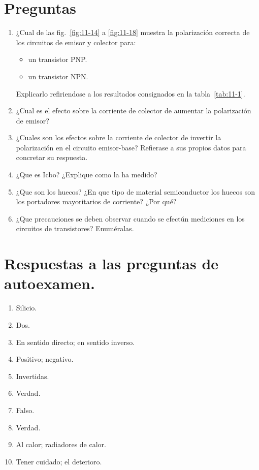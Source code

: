 \documentclass[a4paper,12pt]{article}
\begin{document}
\section{\textbf{Preguntas}}
\begin{enumerate}
    \item ¿Cual de las fig.~\ref{fig:11-14} a \ref{fig:11-18} muestra la polarización correcta de los circuitos de emisor y
          colector para:
          \begin{itemize}
              \item un transistor PNP.
              \item un transistor NPN.
          \end{itemize}
          Explicarlo refiriendose a los resultados consignados en la tabla~\ref{tab:11-1}.
    \item ¿Cual es el efecto sobre la corriente de colector de aumentar la polarización de emisor?
    \item ¿Cuales son los efectos sobre la corriente de colector de invertir la polarización en
          el circuito emisor-base? Refierase a sus propios datos para concretar su respuesta.
    \item ¿Que es Icbo? ¿Explique como la ha medido?
    \item ¿Que son los huecos? ¿En que tipo de material semiconductor los huecos son los portadores
          mayoritarios de corriente? ¿Por qué?
    \item ¿Que precauciones se deben observar cuando se efectún mediciones en los circuitos de
          transistores? Enuméralas.
\end{enumerate}

\section{Respuestas a las preguntas de autoexamen.}
\begin{enumerate}
    \item Silicio.
    \item Dos.
    \item En sentido directo; en sentido inverso.
    \item Positivo; negativo.
    \item Invertidas.
    \item Verdad.
    \item Falso.
    \item Verdad.
    \item Al calor; radiadores de calor.
    \item Tener cuidado; el deterioro.
\end{enumerate}
\end{document}
